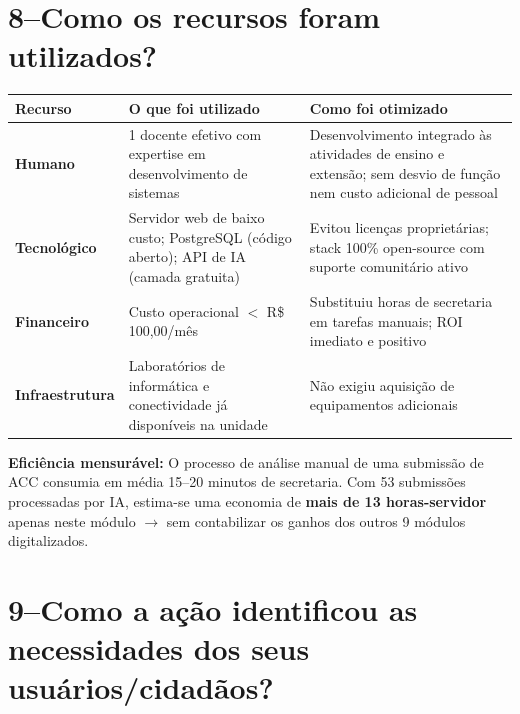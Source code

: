 \documentclass[12pt,a4paper]{article}
\begin{document}
\section{8\;–\;Como os recursos foram utilizados?}

\begin{center}
\renewcommand{\arraystretch}{1.2}
\begin{tabular}{L{2.8cm} L{4.5cm} L{5.5cm}}
\toprule
\textbf{Recurso} & \textbf{O que foi utilizado} & \textbf{Como foi otimizado} \\
\midrule
\textbf{Humano} &
  1 docente efetivo com expertise em desenvolvimento de sistemas &
  Desenvolvimento integrado às atividades de ensino e extensão; sem desvio de função nem custo adicional de pessoal \\
\addlinespace
\textbf{Tecnológico} &
  Servidor web de baixo custo; PostgreSQL (código aberto); API de IA (camada gratuita) &
  Evitou licenças proprietárias; stack 100\% open-source com suporte comunitário ativo \\
\addlinespace
\textbf{Financeiro} &
  Custo operacional $<$ R\$ 100,00/mês &
  Substituiu horas de secretaria em tarefas manuais; ROI imediato e positivo \\
\addlinespace
\textbf{Infraestrutura} &
  Laboratórios de informática e conectividade já disponíveis na unidade &
  Não exigiu aquisição de equipamentos adicionais \\
\bottomrule
\end{tabular}
\end{center}

\begin{tcolorbox}[warnbox]
  \textbf{\faLightbulb\;Eficiência mensurável:} O processo de análise manual de uma
  submissão de ACC consumia em média 15--20 minutos de secretaria. Com 53 submissões
  processadas por IA, estima-se uma economia de \textbf{mais de 13 horas-servidor} apenas
  neste módulo $\rightarrow$ sem contabilizar os ganhos dos outros 9 módulos digitalizados.
\end{tcolorbox}

\section{9\;–\;Como a ação identificou as necessidades dos seus usuários/cidadãos?}
\end{document}
